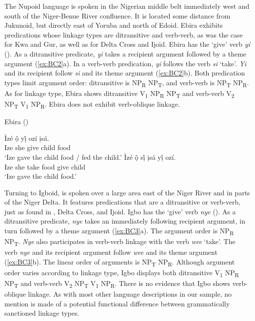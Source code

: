 \documentclass[output=paper,colorlinks,citecolor=brown]{langscibook}
\begin{document}
The Nupoid language  is spoken in the Nigerian middle belt immediately west and south of the Niger-Benue River confluence. It is located some distance from Jukunoid, but directly east of Yoruba and north of Edoid. Ebira exhibits predications whose linkage types are ditransitive and verb-verb, as was the case for Kwa and Gur, as well as for Delta Cross and Ijoid. Ebira has the ‘give’ verb \textit{yí} (\cite{Adive1984}). As a ditransitive predicate, \textit{yi} takes a recipient argument followed by a theme argument (\ref{ex:BC2}a). In a verb-verb predication, \textit{yi} follows the verb \textit{si} ‘take’. \textit{Yi} and its recipient follow \textit{si} and its theme argument (\ref{ex:BC2}b). Both predication types limit argument order: ditransitive is NP\textsubscript{R} NP\textsubscript{T}, and verb-verb is NP\textsubscript{T} NP\textsubscript{R}. As for linkage type, Ebira shows ditransitive V\textsubscript{1} NP\textsubscript{R} NP\textsubscript{T} and verb-verb V\textsubscript{2} NP\textsubscript{T} V\textsubscript{1} NP\textsubscript{R}. Ebira does not exhibit verb-oblique linkage.

\ea \label{ex:BC2} Ebira (\cite[132]{Adive1984})
\begin{xlist}
\ex
\gll Ìzé		ộ			yị́			ozí			ịsá.\\
						Ize	she		give		child	food\\
\glt						‘Ize gave the child food / fed the child.’
\ex
\gll Ìzé	ộ		sị́			ịsá			yị́			ozí.\\
						Ize	she	take		food	give		child\\
\glt						‘Ize gave the child food.’
\end{xlist}
\z

Turning to Igboid,  is spoken over a large area east of the Niger River and in parts of the Niger Delta. It features predications that are a ditransitive or verb-verb, just as found in , Delta Cross, and Ijoid. Igbo has the ‘give’ verb \textit{nye} (\cite{Uwalaka1988}). As a ditransitive predicate, \textit{nye} takes an immediately following recipient argument, in turn followed by a theme argument (\ref{ex:BC3}a). The argument order is NP\textsubscript{R} NP\textsubscript{T}. \textit{Nye} also participates in verb-verb linkage with the verb \textit{wee} ‘take’. The verb \textit{nye} and its recipient argument follow \textit{wee} and its theme argument (\ref{ex:BC3}b). The linear order of arguments is NP\textsubscript{T} NP\textsubscript{R}. Although argument order varies according to linkage type, Igbo displays both ditransitive V\textsubscript{1} NP\textsubscript{R} NP\textsubscript{T} and verb-verb V\textsubscript{2} NP\textsubscript{T} V\textsubscript{1} NP\textsubscript{R}. There is no evidence that Igbo shows verb-oblique linkage. As with most other language descriptions in our sample, no mention is made of a potential functional difference between grammatically sanctioned linkage types.
\end{document}
